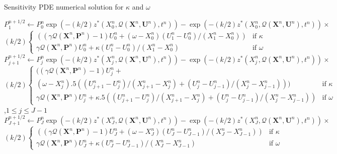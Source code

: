 \documentclass{article}
\begin{document}
\begin{algorithm}
  \caption{Sensitivity PDE numerical solution for $\kappa$ and $\omega$}\label{alg:sens2}
  \begin{algorithmic}
    \State $P_{1}^{n+1/2} \gets P_0^n \exp\left(-(k/2)z^*(X_{0}^{n},\mathcal{Q}(\mathbf{X}^{n},\mathbf{U}^{n}),t^{n})\right)-\exp\left(-(k/2)z^*(X_{0}^{n},\mathcal{Q}(\mathbf{X}^{n},\mathbf{U}^{n}),t^{n})\right)\times$\\ \hspace{1cm} $(k/2)\begin{cases}\left(\left(\gamma\mathcal{Q}(\mathbf{X}^n,\mathbf{P}^n)-1\right)U_0^n + \left(\omega-X_0^n\right)\left(U_1^n - U_0^n\right) / (X_1^n - X_0^n)\right) & \text{if } \kappa \\ \gamma\mathcal{Q}(\mathbf{X}^n,\mathbf{P}^n)U_0^n + \kappa(U_1^n - U_0^n) / (X_1^n - X_0^n) & \text{if } \omega \end{cases}$ 
    \State $P_{j+1}^{n+1/2} \gets P_j^n \exp\left(-(k/2)z^*(X_{j}^{n},\mathcal{Q}(\mathbf{X}^{n},\mathbf{U}^{n}),t^{n})\right)-\exp\left(-(k/2)z^*(X_{j}^{n},\mathcal{Q}(\mathbf{X}^{n},\mathbf{U}^{n}),t^{n})\right)\times$\\ \hspace{.2cm} $(k/2)\begin{cases} \bigg(\left(\gamma\mathcal{Q}(\mathbf{X}^n,\mathbf{P}^n)-1\right)U_j^n + \\ \left(\omega-X_j^n\right).5\left( (U_{j+1}^n - U_{j}^n) / (X_{j+1}^n - X_{j}^n) + (U_{j}^n - U_{j-1}^n) / (X_{j}^n - X_{j-1}^n)\right) \bigg) & \text{if } \kappa \\ \gamma\mathcal{Q}(\mathbf{X}^n,\mathbf{P}^n)U_j^n + \kappa .5\left( (U_{j+1}^n - U_{j}^n) / (X_{j+1}^n - X_{j}^n) + (U_{j}^n - U_{j-1}^n) / (X_{j}^n - X_{j-1}^n)\right) & \text{if } \omega \end{cases}$\\ \hspace{.5cm},$1 \leq j \leq J-1$
    \State $P_{J+1}^{n+1/2} \gets P_J^n \exp\left(-(k/2)z^*(X_{J}^{n},\mathcal{Q}(\mathbf{X}^{n},\mathbf{U}^{n}),t^{n})\right)-\exp\left(-(k/2)z^*(X_{J}^{n},\mathcal{Q}(\mathbf{X}^{n},\mathbf{U}^{n}),t^{n})\right)\times$\\ \hspace{1cm} $(k/2)\begin{cases}\left(\left(\gamma\mathcal{Q}(\mathbf{X}^n,\mathbf{P}^n)-1\right)U_J^n + \left(\omega-X_J^n\right)\left(U_J^n - U_{J-1}^n\right) / (X_J^n - X_{J-1}^n)\right) & \text{if } \kappa \\ \gamma\mathcal{Q}(\mathbf{X}^n,\mathbf{P}^n)U_J^n + \kappa(U_J^n - U_{J-1}^n) / (X_J^n - X_{J-1}^n) & \text{if } \omega \end{cases}$

\end{algorithmic}
\end{algorithm}
\end{document}
